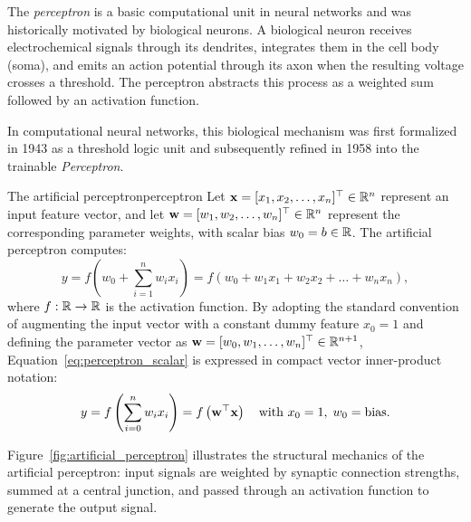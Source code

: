 \documentclass[../../main.tex]{subfiles}
\begin{document}
The \emph{perceptron} is a basic computational unit in neural networks and was historically motivated by biological neurons. A biological neuron receives electrochemical signals through its dendrites, integrates them in the cell body (soma), and emits an action potential through its axon when the resulting voltage crosses a threshold. The perceptron abstracts this process as a weighted sum followed by an activation function.

In computational neural networks, this biological mechanism was first formalized in 1943 \cite{mcculloch1943} as a threshold logic unit and subsequently refined in 1958 \cite{rosenblatt1958} into the trainable \emph{Perceptron}.

\begin{definition}{The artificial perceptron}{perceptron}
Let $\mathbf{x} = [x_1, x_2, \dots, x_n]^\top \in \mathbb{R}^n$ represent an input feature vector, and let $\mathbf{w} = [w_1, w_2, \dots, w_n]^\top \in \mathbb{R}^n$ represent the corresponding parameter weights, with scalar bias $w_0 = b \in \mathbb{R}$. The artificial perceptron computes:
\begin{equation}
\label{eq:perceptron_scalar}
y = f\left( w_0 + \sum_{i=1}^n w_i x_i \right) = f\left( w_0 + w_1 x_1 + w_2 x_2 + \dots + w_n x_n \right),
\end{equation}
where $f: \mathbb{R} \to \mathbb{R}$ is the activation function. By adopting the standard convention of augmenting the input vector with a constant dummy feature $x_0 = 1$ and defining the parameter vector as $\mathbf{w} = [w_0, w_1, \dots, w_n]^\top \in \mathbb{R}^{n+1}$, Equation~\eqref{eq:perceptron_scalar} is expressed in compact vector inner-product notation:
\begin{equation}
\label{eq:perceptron_vector}
y = f\left( \sum_{i=0}^n w_i x_i \right) = f\left( \mathbf{w}^\top \mathbf{x} \right) \quad \text{with } x_0 = 1, \; w_0 = \text{bias}.
\end{equation}
\end{definition}

Figure~\ref{fig:artificial_perceptron} illustrates the structural mechanics of the artificial perceptron: input signals are weighted by synaptic connection strengths, summed at a central junction, and passed through an activation function to generate the output signal.
\end{document}
